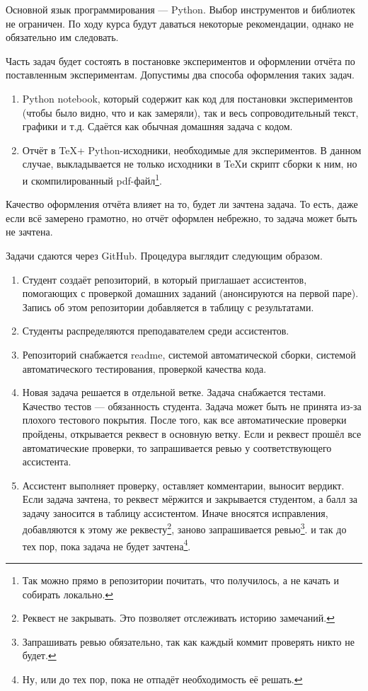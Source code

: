 Основной язык программирования --- Python. Выбор инструментов и библиотек не ограничен. По ходу курса будут даваться некоторые рекомендации, однако не обязательно им следовать.

Часть задач будет состоять в постановке экспериментов и оформлении отчёта по поставленным экспериментам. Допустимы два способа оформления таких задач.
\begin{enumerate}
    \item Python notebook, который содержит как код для постановки экспериментов (чтобы было видно, что и как замеряли), так и весь сопроводительный текст, графики и т.д. Сдаётся как обычная домашняя задача с кодом.
    \item Отчёт в \TeX + Python-исходники, необходимые для экспериментов. В данном случае, выкладывается не только исходники в \TeX и скрипт сборки к ним, но и скомпилированный pdf-файл\footnote{Так можно прямо в репозитории почитать, что получилось, а не качать и собирать локально.}. 
\end{enumerate}

Качество оформления отчёта влияет на то, будет ли зачтена задача. То есть, даже если всё замерено грамотно, но отчёт оформлен небрежно, то задача может быть не зачтена.

Задачи сдаются через GitHub. Процедура выглядит следующим образом.
\begin{enumerate}
    \item Студент создаёт репозиторий, в который приглашает ассистентов, помогающих с проверкой домашних заданий (анонсируются на первой паре). Запись об этом репозитории добавляется в таблицу с результатами. 
    \item Студенты распределяются преподавателем среди ассистентов.
    \item Репозиторий снабжается readme, системой автоматической сборки, системой автоматического тестирования, проверкой качества кода. 
    \item Новая задача решается в отдельной ветке. Задача снабжается тестами. Качество тестов --- обязанность студента. Задача может быть не принята из-за плохого тестового покрытия. После того, как все автоматические проверки пройдены, открывается реквест в основную ветку. Если и реквест прошёл все автоматические проверки, то запрашивается ревью у соответствующего ассистента. 
    \item Ассистент выполняет проверку, оставляет комментарии, выносит вердикт. Если задача зачтена, то реквест мёржится и закрывается студентом, а балл за задачу заносится в таблицу ассистентом. Иначе вносятся исправления, добавляются к этому же реквесту\footnote{Реквест не закрывать. Это позволяет отслеживать историю замечаний.}, заново запрашивается ревью\footnote{Запрашивать ревью обязательно, так как каждый коммит проверять никто не будет.}. и так до тех пор, пока задача не будет зачтена\footnote{Ну, или до тех пор, пока не отпадёт необходимость её решать.}.
\end{enumerate}


